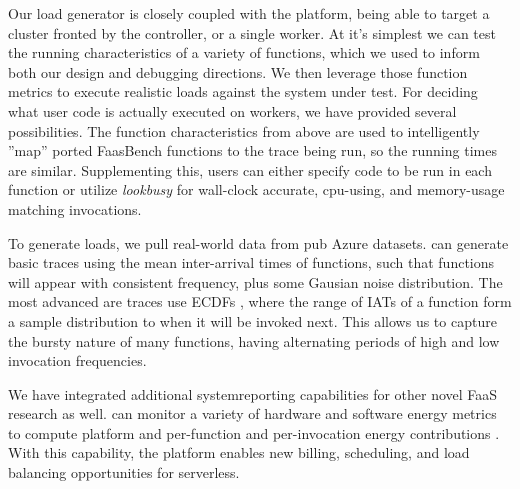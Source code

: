 Our load generator is closely coupled with the platform, being able to target a cluster fronted by the controller, or a single worker.
At it's simplest we can test the running characteristics of a variety of functions, which we used to inform both our design and debugging directions.
We then leverage those function metrics to execute realistic loads against the system under test.
For deciding what user code is actually executed on workers, we have provided several possibilities.
The function characteristics from above are used to intelligently ''map'' ported FaasBench \cite{} functions to the trace being run, so the running times are similar.
Supplementing this, users can either specify code to be run in each function or utilize \emph{lookbusy} \cite{} for wall-clock accurate, cpu-using, and memory-usage matching invocations.


To generate loads, we pull real-world data from pub Azure \cite{} datasets.
\sysname{} can generate basic traces using the mean inter-arrival times of functions, such that functions will appear with consistent frequency, plus some Gausian noise distribution.
The most advanced are traces use ECDFs \cite{}, where the range of IATs of a function form a sample distribution to when it will be invoked next.
This allows us to capture the bursty nature of many functions, having alternating periods of high and low invocation frequencies.

We have integrated additional systemreporting capabilities for other novel FaaS research as well.
\sysname{} can monitor a variety of hardware and software energy metrics to compute platform and per-function and per-invocation energy contributions \cite{}.
With this capability, the platform enables new billing, scheduling, and load balancing opportunities for serverless.

